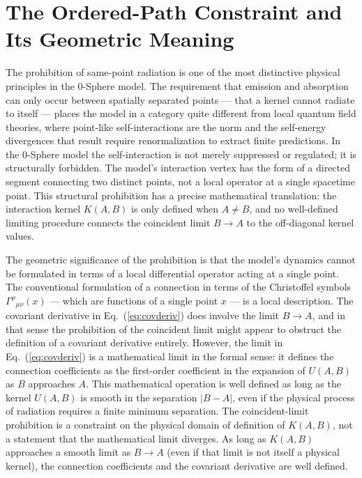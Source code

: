 \documentclass[%
 reprint,
 amsmath,amssymb,
 aps,
 prb,
]{revtex4-2}
\numberwithin{equation}{section}
\newcommand{\UAB}{U(A,B)}
\newcommand{\KAB}{K(A,B)}
\begin{document}
\section{The Ordered-Path Constraint and Its Geometric Meaning}
\label{sec:ordered}

The prohibition of same-point radiation is one of the most distinctive physical principles in the 0-Sphere model. The requirement that emission and absorption can only occur between spatially separated points --- that a kernel cannot radiate to itself --- places the model in a category quite different from local quantum field theories, where point-like self-interactions are the norm and the self-energy divergences that result require renormalization to extract finite predictions. In the 0-Sphere model the self-interaction is not merely suppressed or regulated; it is structurally forbidden. The model's interaction vertex has the form of a directed segment connecting two distinct points, not a local operator at a single spacetime point. This structural prohibition has a precise mathematical translation: the interaction kernel $\KAB$ is only defined when $A \neq B$, and no well-defined limiting procedure connects the coincident limit $B\to A$ to the off-diagonal kernel values.

The geometric significance of the prohibition is that the model's dynamics cannot be formulated in terms of a local differential operator acting at a single point. The conventional formulation of a connection in terms of the Christoffel symbols $\Gamma^\rho{}_{\mu\nu}(x)$ --- which are functions of a single point $x$ --- is a local description. The covariant derivative in Eq.~(\ref{eq:covderiv}) does involve the limit $B\to A$, and in that sense the prohibition of the coincident limit might appear to obstruct the definition of a covariant derivative entirely. However, the limit in Eq.~(\ref{eq:covderiv}) is a mathematical limit in the formal sense: it defines the connection coefficients as the first-order coefficient in the expansion of $\UAB$ as $B$ approaches $A$. This mathematical operation is well defined as long as the kernel $\UAB$ is smooth in the separation $|B-A|$, even if the physical process of radiation requires a finite minimum separation. The coincident-limit prohibition is a constraint on the physical domain of definition of $\KAB$, not a statement that the mathematical limit diverges. As long as $\KAB$ approaches a smooth limit as $B\to A$ (even if that limit is not itself a physical kernel), the connection coefficients and the covariant derivative are well defined.
\end{document}
